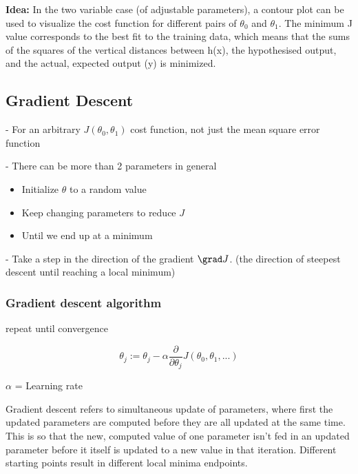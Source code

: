 \documentclass{article}
\begin{document}
\begin{mybox}
\textbf{Idea:} In the two variable case (of  adjustable parameters), a contour plot can be used to visualize the cost function for different pairs of $\theta_0$  and $ \theta_1$. The minimum J value corresponds to the best fit to the training data, which means that the sums of the squares of the vertical distances between h(x), the hypothesised output, and the actual, expected output (y) is minimized. 
\end{mybox}


\subsection{Gradient Descent} \label{gradientdescent}

- For an arbitrary $J(\theta_0, \theta_1)$ cost function, not just the mean square error function

- There can be more than 2 parameters in general 


\begin{itemize}
    \item Initialize $\theta$ to a random value
    \item Keep changing parameters to reduce $J$
    \item Until we end up at a minimum 
\end{itemize}


- Take a step in the direction of the gradient $\grad J$. (the direction of steepest descent until reaching a local minimum)

\subsubsection{Gradient descent algorithm}

repeat until convergence 

\begin{equation}
    \theta_j := \theta_j - \alpha \frac{\partial}{\partial \theta_j} J(\theta_0, \theta_1, ...)
\end{equation}


$\alpha$ = Learning rate 


Gradient descent refers to simultaneous update of parameters, where first the updated parameters are computed before they are all updated at the same time.
This is so that the new, computed value of one parameter isn't fed in an updated parameter before it itself is updated to a new value in that iteration.
Different starting points result in different local minima endpoints.
\end{document}
